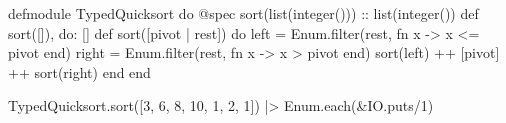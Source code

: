 defmodule TypedQuicksort do
  @spec sort(list(integer())) :: list(integer())
  def sort([]), do: []
  def sort([pivot | rest]) do
    left = Enum.filter(rest, fn x -> x <= pivot end)
    right = Enum.filter(rest, fn x -> x > pivot end)
    sort(left) ++ [pivot] ++ sort(right)
  end
end

TypedQuicksort.sort([3, 6, 8, 10, 1, 2, 1]) |> Enum.each(&IO.puts/1)
